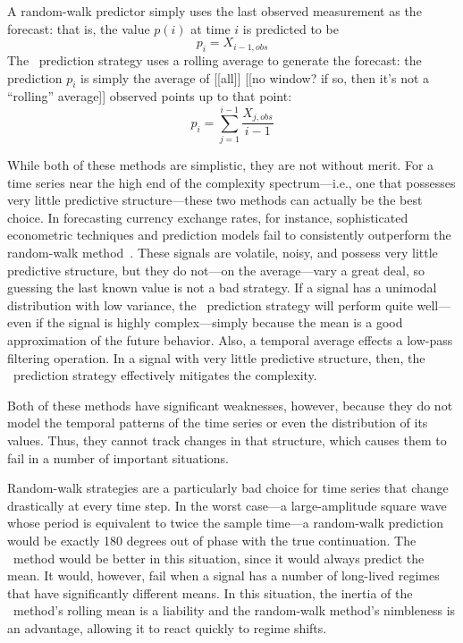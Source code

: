 A random-walk predictor simply uses the last observed measurement as
the forecast: that is, the value $p(i)$ at time $i$ is predicted to
be $$p_i = X_{i-1,obs}$$ The \naive ~prediction strategy uses a
rolling average to generate the forecast: the prediction $p_i$ is
simply the average of [[all]] [[no window?  if so, then it's not a
    ``rolling'' average]] observed points up to that point: $$p_i =
\sum_{j=1}^{i-1}\frac{X_{j,obs}}{i-1}$$

While both of these methods are simplistic, they are not without
merit.  For a time series near the high end of the complexity
spectrum---i.e., one that possesses very little predictive
structure---these two methods can actually be the best choice.  In
forecasting currency exchange rates, for instance, sophisticated
econometric techniques and prediction models fail to consistently
outperform the random-walk method~\cite{rwMeese,rwCCE}.  These signals
are volatile, noisy, and possess very little predictive structure, but
they do not---on the average---vary a great deal, so guessing the last
known value is not a bad strategy.  If a signal has a unimodal
distribution with low variance, the \naive ~prediction strategy will
perform quite well---even if the signal is highly complex---simply
because the mean is a good approximation of the future behavior.
Also, a temporal average effects a low-pass filtering operation.  In a
signal with very little predictive structure, then, the \naive
~prediction strategy effectively mitigates the complexity.

Both of these methods have significant weaknesses, however, because
they do not model the temporal patterns of the time series or even the
distribution of its values.  Thus, they cannot track changes in that
structure, which causes them to fail in a number of important
situations.  

Random-walk strategies are a particularly bad choice for time series
that change drastically at every time step.  In the worst case---a
large-amplitude square wave whose period is equivalent to twice the
sample time---a random-walk prediction would be exactly 180 degrees
out of phase with the true continuation.  The \naive ~method would be
better in this situation, since it would always predict the mean.  It
would, however, fail when a signal has a number of long-lived regimes
that have significantly different means.  In this situation, the
inertia of the \naive ~method's rolling mean is a liability and the
random-walk method's nimbleness is an advantage, allowing it to
react quickly to regime shifts.

